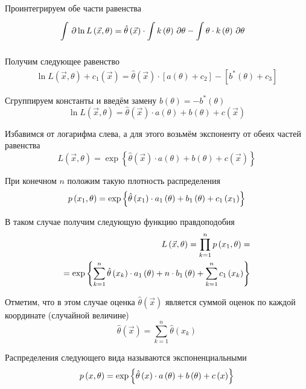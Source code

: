 Проинтегрируем обе части равенства
\begin{align*}
  \int\limits_{}^{}  \, \partial \ln{L\left( \vec{x},\theta \right)}
    &=\hat{\theta}\left( \vec{x} \right)
        \cdot \int\limits_{}^{} k\left( \theta \right) \, \partial \theta
      -\int\limits_{}^{} \theta\cdot k\left( \theta \right) \, \partial \theta
\end{align*}

Получим следующее равенство
\begin{align*}
  \ln{L\left( \vec{x},\theta \right)}+c_1\left( \vec{x} \right)
    =\hat{\theta}\left( \vec{x} \right)
        \cdot \left[ a\left( \theta \right)+c_2\right]
      -\left[b^*\left( \theta \right)+c_3\right]
\end{align*}

Сгруппируем константы и введём замену
$b\left( \theta \right)=-b^*\left( \theta \right)$
$$\ln{L\left( \vec{x},\theta \right)}
  =\hat{\theta}\left( \vec{x} \right)\cdot a\left( \theta \right)
    +b\left( \theta \right)+c\left( \vec{x} \right)$$

Избавимся от логарифма слева, а для этого возьмём экспоненту от обеих частей
равенства
$$L\left( \vec{x},\theta \right)
  =\exp{\left\{\hat{\theta}\left( \vec{x} \right)\cdot a\left( \theta \right)
  +b\left( \theta \right)+c\left( \vec{x} \right)\right\}}$$

При конечном $n$ положим такую плотность распределения
$$p\left(x_1,\theta\right)
  =\exp{\left\{\hat{\theta}\left(x_1\right)\cdot a_1\left(\theta\right)
    +b_1\left( \theta \right)+c_1\left( x_1 \right)\right\}}$$

В таком случае получим следующую функцию правдоподобия
\begin{align*}
  L\left( \vec{x},\theta \right)
  =\prod_{k=1}^np\left(x_1,\theta\right)=\\
  =\exp{\left\{\sum_{k=1}^n \hat{\theta}\left(x_k\right)\cdot a_1\left(\theta\right)
    +n\cdot b_1\left( \theta \right)
    +\sum_{k=1}^n c_1\left( x_k \right)\right\}}
\end{align*}

Отметим, что в этом случае оценка $\hat{\theta}\left( \vec{x} \right)$
является суммой оценок по каждой координате (случайной величине)
$$\hat{\theta}\left(\vec{x}\right)=\sum_{k=1}^n \hat{\theta}\left(x_k\right)$$

\begin{definition}
  \label{def:exponentialDistribution}
  Распределения следующего вида называются экспоненциальными
  $$p\left(x,\theta\right)
    =\exp{\left\{\hat{\theta}\left(x\right)\cdot a\left(\theta\right)
      +b\left( \theta \right)+c\left( x \right)\right\}}$$
\end{definition}

